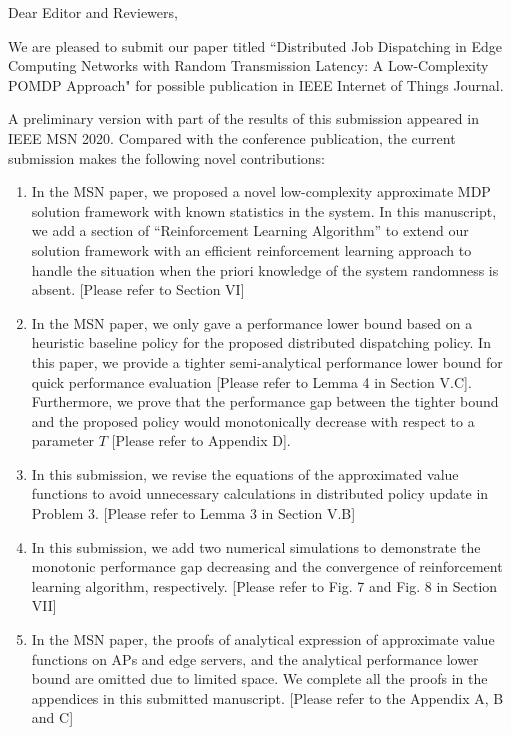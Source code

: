 \documentclass[10pt,draftclsnofoot,onecolumn]{article}
\begin{document}
Dear Editor and Reviewers,

We are pleased to submit our paper titled ``Distributed Job Dispatching in Edge Computing Networks with Random Transmission Latency: A Low-Complexity POMDP Approach" for possible publication in IEEE Internet of Things Journal.

A preliminary version with part of the results of this submission appeared in IEEE MSN 2020.
Compared with the conference publication, the current submission makes the following novel contributions:
\begin{enumerate}
\item In the MSN paper, we proposed a novel low-complexity approximate MDP solution framework with known statistics in the system.
In this manuscript, we add a section of ``Reinforcement Learning Algorithm'' to extend our solution framework with an efficient reinforcement learning approach to handle the situation when the priori knowledge of the system randomness is absent. [Please refer to Section VI]

\item In the MSN paper, we only gave a performance lower bound based on a heuristic baseline policy for the proposed distributed dispatching policy. In this paper, we provide a tighter semi-analytical performance lower bound for quick performance evaluation [Please refer to Lemma 4 in Section V.C]. 
Furthermore, we prove that the performance gap between the tighter bound and the proposed policy would monotonically decrease with respect to a parameter $T$ [Please refer to Appendix D]. 

\item In this submission, we revise the equations of the approximated value functions to avoid unnecessary calculations in distributed policy update in Problem 3. [Please refer to Lemma 3 in Section V.B]

\item In this submission, we add two numerical simulations to demonstrate the monotonic performance gap decreasing and the convergence of reinforcement learning algorithm, respectively. [Please refer to Fig. 7 and Fig. 8 in Section VII]

\item In the MSN paper, the proofs of analytical expression of approximate value functions on APs and edge servers, and the analytical performance lower bound are omitted due to limited space. We complete all the proofs in the appendices in this submitted manuscript. [Please refer to the Appendix A, B and C]


\end{enumerate}
\end{document}
